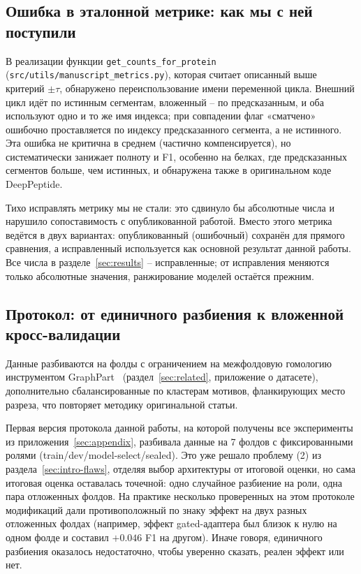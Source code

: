 \documentclass{article}
\begin{document}
\subsection{Ошибка в эталонной метрике: как мы с ней поступили}
\label{sec:eval-metric}

В реализации функции \texttt{get\_counts\_for\_protein} (\texttt{src/utils/manuscript\_metrics.py}), которая считает описанный выше критерий $\pm\tau$, обнаружено переиспользование имени переменной цикла. Внешний цикл идёт по истинным сегментам, вложенный -- по предсказанным, и оба используют одно и то же имя индекса; при совпадении флаг «сматчено» ошибочно проставляется по индексу предсказанного сегмента, а не истинного. Эта ошибка не критична в среднем (частично компенсируется), но систематически занижает полноту и F1, особенно на белках, где предсказанных сегментов больше, чем истинных, и обнаружена также в оригинальном коде DeepPeptide.

Тихо исправлять метрику мы не стали: это сдвинуло бы абсолютные числа и нарушило сопоставимость с опубликованной работой. Вместо этого метрика ведётся в двух вариантах: опубликованный (ошибочный) сохранён для прямого сравнения, а исправленный используется как основной результат данной работы. Все числа в разделе~\ref{sec:results} -- исправленные; от исправления меняются только абсолютные значения, ранжирование моделей остаётся прежним.

\subsection{Протокол: от единичного разбиения к вложенной кросс-валидации}
\label{sec:eval-protocol}

Данные разбиваются на фолды с ограничением на межфолдовую гомологию инструментом GraphPart~\cite{graphpart2023} (раздел~\ref{sec:related}, приложение о датасете), дополнительно сбалансированные по кластерам мотивов, фланкирующих место разреза, что повторяет методику оригинальной статьи.

Первая версия протокола данной работы, на которой получены все эксперименты из приложения~\ref{sec:appendix}, разбивала данные на 7 фолдов с фиксированными ролями (train/dev/model-select/sealed). Это уже решало проблему (2) из раздела~\ref{sec:intro-flaws}, отделяя выбор архитектуры от итоговой оценки, но сама итоговая оценка оставалась точечной: одно случайное разбиение на роли, одна пара отложенных фолдов. На практике несколько проверенных на этом протоколе модификаций дали противоположный по знаку эффект на двух разных отложенных фолдах (например, эффект gated-адаптера был близок к нулю на одном фолде и составил $+0.046$ F1 на другом). Иначе говоря, единичного разбиения оказалось недостаточно, чтобы уверенно сказать, реален эффект или нет.
\end{document}

